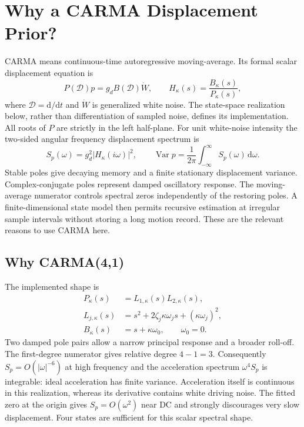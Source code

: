 \documentclass[conference]{IEEEtran}
\newcommand{\dd}{\mathrm d}
\DeclareMathOperator{\Var}{Var}
\begin{document}
\section{Why a CARMA Displacement Prior?}
\label{sec:carma}
CARMA means continuous-time autoregressive moving-average. Its formal
scalar displacement equation is
\begin{equation}
 P(\mathcal D)p=g_d B(\mathcal D)\dot W,\qquad
 H_\kappa(s)=\frac{B_\kappa(s)}{P_\kappa(s)},
 \label{eq:carma}
\end{equation}
where $\mathcal D=\dd/\dd t$ and $\dot W$ is generalized white noise.
The state-space realization below, rather than differentiation of sampled
noise, defines its implementation. All roots of $P$ are strictly in the
left half-plane. For unit white-noise intensity the two-sided angular
frequency displacement spectrum is
\begin{equation}
 S_p(\omega)=g_d^2|H_\kappa(i\omega)|^2,\qquad
 \Var p=\frac{1}{2\pi}\int_{-\infty}^{\infty}S_p(\omega)\,\dd\omega.
 \label{eq:psd}
\end{equation}
Stable poles give decaying memory and a finite stationary displacement
variance. Complex-conjugate poles represent damped oscillatory response.
The moving-average numerator controls spectral zeros independently of the
restoring poles. A finite-dimensional state model then permits recursive
estimation at irregular sample intervals without storing a long motion
record. These are the relevant reasons to use CARMA here.

\subsection{Why CARMA(4,1)}
The implemented shape is
\begin{align}
 P_\kappa(s)&=L_{1,\kappa}(s)L_{2,\kappa}(s),\nonumber\\
 L_{j,\kappa}(s)&=s^2+2\zeta_j\kappa\omega_j s+(\kappa\omega_j)^2,
 \label{eq:poles}\\
 B_\kappa(s)&=s+\kappa\omega_0,\qquad \omega_0=0.
 \label{eq:zero}
\end{align}
Two damped pole pairs allow a narrow principal response and a broader
roll-off. The first-degree numerator gives relative degree $4-1=3$.
Consequently $S_p=O(|\omega|^{-6})$ at high frequency and the acceleration
spectrum $\omega^4 S_p$ is integrable: ideal acceleration has finite
variance. Acceleration itself is continuous in this realization, whereas
its derivative contains white driving noise. The fitted zero at the
origin gives $S_p=O(\omega^2)$ near DC and strongly discourages very slow
displacement. Four states are sufficient for this scalar spectral shape.
\end{document}
